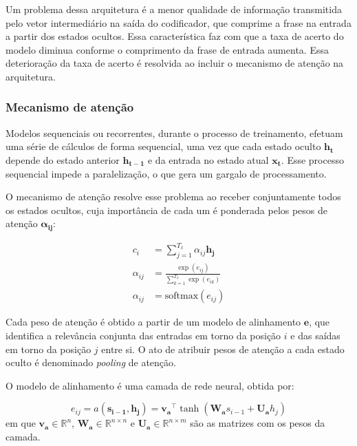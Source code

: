Um problema dessa arquitetura é a menor qualidade de informação transmitida pelo
vetor intermediário na saída do codificador, que comprime a frase na entrada a
partir dos estados ocultos. Essa característica faz com que a taxa de acerto do
modelo diminua conforme o comprimento da frase de entrada aumenta. Essa
deterioração da taxa de acerto é resolvida ao incluir o mecanismo de atenção
na arquitetura.

\subsubsection{Mecanismo de atenção}
Modelos sequenciais ou recorrentes, durante o processo de treinamento, efetuam
uma série de cálculos de forma sequencial, uma vez que cada estado oculto
$\mathbf{h_t}$ depende do estado anterior $\mathbf{h_{t-1}}$ e da entrada no
estado atual $\mathbf{x_t}$. Esse processo sequencial impede a paralelização, o
que gera um gargalo de processamento.

O mecanismo de atenção \cite{bahdanau2016neural} resolve esse problema ao
receber conjuntamente todos os estados ocultos, cuja importância de cada um é
ponderada pelos pesos de atenção $\mathbf{\alpha_{ij}}$:


\begin{align}
    c_i &= \sum_{j=1}^{T_x} \alpha_{ij} \mathbf{h_j} \\
    \alpha_{ij} &= \frac{\exp(e_{ij})}{\sum_{k=1}^{T_x} \exp(e_{ik})} \\
    \alpha_{ij} &=  \text{softmax}(e_{ij})
\end{align}

Cada peso de atenção é obtido a partir de um modelo de alinhamento $\mathbf{e}$,
que identifica a relevância conjunta das entradas em torno da posição $i$ e das
saídas em torno da posição $j$ entre si. O ato de atribuir pesos de atenção a
cada estado oculto é denominado \textit{pooling} de atenção.

O modelo de alinhamento é uma camada de
rede neural, obtida por:

\begin{equation}
    e_{ij} = a(\mathbf{s_{i-1}}, \mathbf{h_j}) = \mathbf{v_a}^\top \tanh(\mathbf{W_a}s_{i-1} + \mathbf{U_a}h_j)
\end{equation}
em que $\mathbf{v_a} \in \mathbb{R}^n$, $\mathbf{W_a} \in \mathbb{R}^{n \times
n}$ e $\mathbf{U_a} \in \mathbb{R}^{n \times m}$ são as matrizes com os pesos da
camada.

